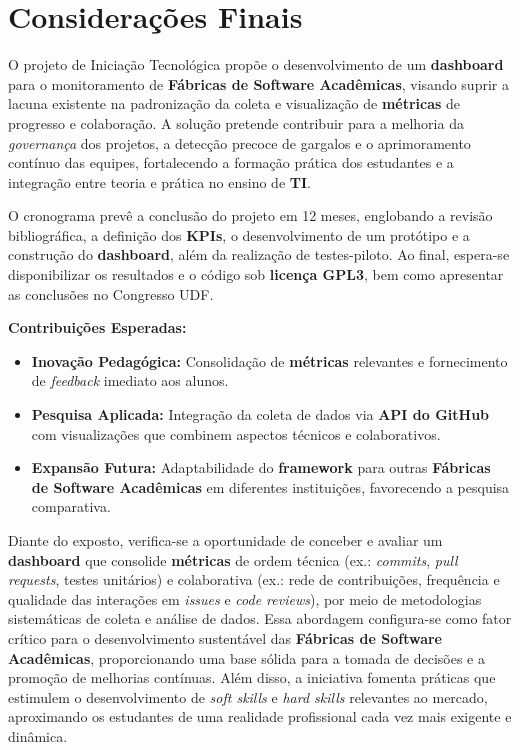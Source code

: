 \documentclass[
	12pt,           %
	openright,      %
	oneside,        %
	a4paper,        %
	brazil          %
]{abntex2}
\begin{document}
\section[Considerações Finais]{Considerações Finais}

O projeto de Iniciação Tecnológica propõe o desenvolvimento de um \textbf{dashboard} para o monitoramento de \textbf{Fábricas de Software Acadêmicas}, visando suprir a lacuna existente na padronização da coleta e visualização de \textbf{métricas} de progresso e colaboração. A solução pretende contribuir para a melhoria da \emph{governança} dos projetos, a detecção precoce de gargalos e o aprimoramento contínuo das equipes, fortalecendo a formação prática dos estudantes e a integração entre teoria e prática no ensino de \textbf{TI}.

O cronograma prevê a conclusão do projeto em 12 meses, englobando a revisão bibliográfica, a definição dos \textbf{KPIs}, o desenvolvimento de um protótipo e a construção do \textbf{dashboard}, além da realização de testes-piloto. Ao final, espera-se disponibilizar os resultados e o código sob \textbf{licença GPL3}, bem como apresentar as conclusões no Congresso UDF.

\noindent\textbf{Contribuições Esperadas:}
\begin{itemize}
    \item \textbf{Inovação Pedagógica:} Consolidação de \textbf{métricas} relevantes e fornecimento de \emph{feedback} imediato aos alunos.
    \item \textbf{Pesquisa Aplicada:} Integração da coleta de dados via \textbf{API do GitHub} com visualizações que combinem aspectos técnicos e colaborativos.
    \item \textbf{Expansão Futura:} Adaptabilidade do \textbf{framework} para outras \textbf{Fábricas de Software Acadêmicas} em diferentes instituições, favorecendo a pesquisa comparativa.
\end{itemize}

Diante do exposto, verifica-se a oportunidade de conceber e avaliar um \textbf{dashboard} que consolide \textbf{métricas} de ordem técnica (ex.: \emph{commits}, \emph{pull requests}, testes unitários) e colaborativa (ex.: rede de contribuições, frequência e qualidade das interações em \emph{issues} e \emph{code reviews}), por meio de metodologias sistemáticas de coleta e análise de dados. Essa abordagem configura-se como fator crítico para o desenvolvimento sustentável das \textbf{Fábricas de Software Acadêmicas}, proporcionando uma base sólida para a tomada de decisões e a promoção de melhorias contínuas. Além disso, a iniciativa fomenta práticas que estimulem o desenvolvimento de \emph{soft skills} e \emph{hard skills} relevantes ao mercado, aproximando os estudantes de uma realidade profissional cada vez mais exigente e dinâmica.
\end{document}
